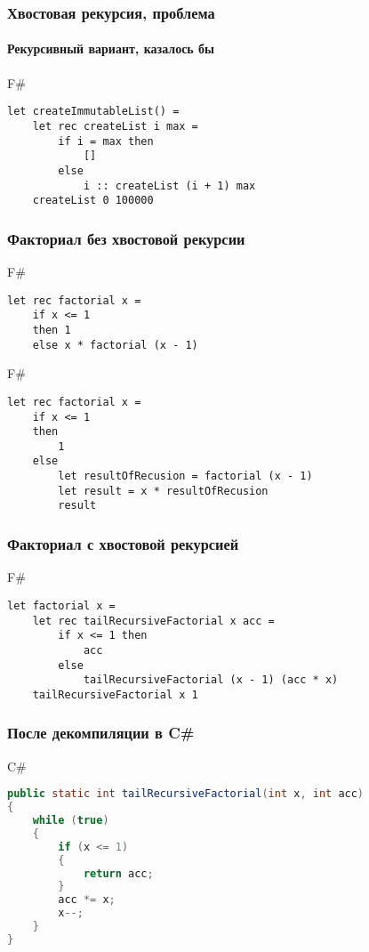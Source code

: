 \documentclass[xetex,mathserif,serif]{beamer}
\begin{document}
\begin{frame}[fragile]
	\frametitle{Хвостовая рекурсия, проблема}
	\framesubtitle{Рекурсивный вариант, казалось бы}
	\begin{exampleblock}{F\#}
		\begin{lstlisting}
let createImmutableList() =
    let rec createList i max =
        if i = max then
            []	
        else
            i :: createList (i + 1) max
    createList 0 100000
\end{lstlisting}
\end{exampleblock}
	
\end{frame}

\begin{frame}[fragile]
	\frametitle{Факториал без хвостовой рекурсии}
	\begin{exampleblock}{F\#}
		\begin{lstlisting}
let rec factorial x =
    if x <= 1
    then 1 
    else x * factorial (x - 1)
\end{lstlisting}
\end{exampleblock}
	
	\begin{exampleblock}{F\#}
		\begin{lstlisting}
let rec factorial x =
    if x <= 1
    then
        1
    else
        let resultOfRecusion = factorial (x - 1)
        let result = x * resultOfRecusion
        result
\end{lstlisting}
\end{exampleblock}
	
\end{frame}

\begin{frame}[fragile]
	\frametitle{Факториал с хвостовой рекурсией}
	\begin{exampleblock}{F\#}
		\begin{lstlisting}
let factorial x =
    let rec tailRecursiveFactorial x acc =
        if x <= 1 then
            acc
        else
            tailRecursiveFactorial (x - 1) (acc * x)
    tailRecursiveFactorial x 1
\end{lstlisting}
\end{exampleblock}

\end{frame}
	
\begin{frame}[fragile]
	\frametitle{После декомпиляции в C\#}
		\begin{alertblock}{C\#}
			\begin{lstlisting}[language=Java]
public static int tailRecursiveFactorial(int x, int acc)
{
    while (true)
    {
        if (x <= 1)
        {
            return acc;
        }
        acc *= x;
        x--;
    }
}
\end{lstlisting}
\end{alertblock}
	
\end{frame}
\end{document}
